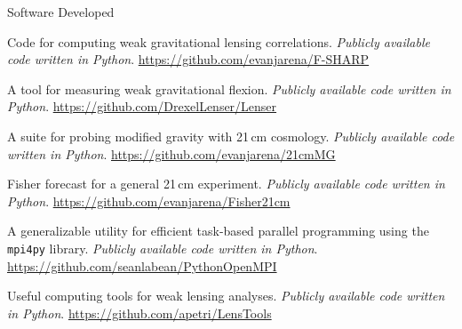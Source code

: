 \documentclass{resume} %
\begin{document}
\begin{rSection}{Software Developed}

\underline{}

\begin{description}[leftmargin=10em, style=nextline]

\item[\texttt{F-SHARP}] Code for computing weak gravitational lensing correlations. \textit{Publicly available code written in Python}. \href{https://github.com/evanjarena/F-SHARP}{https://github.com/evanjarena/F-SHARP}

\item[\texttt{Lenser}] A tool for measuring weak gravitational flexion. \textit{Publicly available code written in Python}. \href{https://github.com/DrexelLenser/Lenser}{https://github.com/DrexelLenser/Lenser}

\item[21cmMG] A suite for probing modified gravity with 21\,cm cosmology. \textit{Publicly available code written in Python}. \href{https://github.com/evanjarena/21cmMG}{https://github.com/evanjarena/21cmMG}

\item[Fisher21cm] Fisher forecast for a general 21\,cm experiment. \textit{Publicly available code written in Python}. \href{https://github.com/evanjarena/Fisher21cm}{https://github.com/evanjarena/Fisher21cm}

\end{description}

\underline{}

\begin{description}[leftmargin=10em, style=nextline]

\item[\texttt{PythonOpenMPI}] A generalizable utility for efficient task-based parallel programming using the \texttt{mpi4py} library. \textit{Publicly available code written in Python}. \\ \href{https://github.com/seanlabean/PythonOpenMPI}{https://github.com/seanlabean/PythonOpenMPI}

\item[\texttt{LensTools}] Useful computing tools for weak lensing analyses. \textit{Publicly available code written in Python}. \href{https://github.com/apetri/LensTools}{https://github.com/apetri/LensTools}

\end{description}

\end{rSection}
\end{document}
